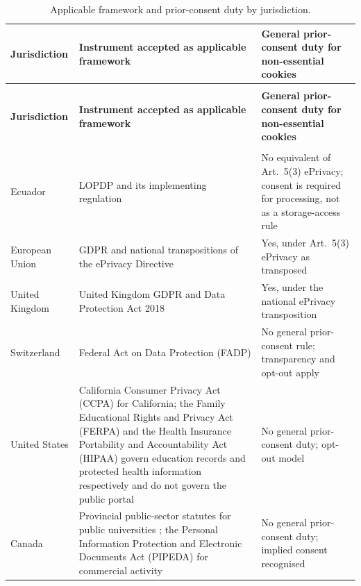 \documentclass[pdflatex,sn-basic,Numbered,iicol]{sn-jnl}
\theoremstyle{thmstyleone}
\theoremstyle{thmstyletwo}
\theoremstyle{thmstylethree}
\begin{document}
\begin{appendices}
\footnotesize
\begin{longtable}{@{}>{\RaggedRight}p{2.4cm}>{\RaggedRight}p{5.5cm}>{\RaggedRight\arraybackslash}p{4.1cm}@{}}
	\caption{Applicable framework and prior-consent duty by jurisdiction.}\label{tab:mapeo}\\
	\toprule
	\textbf{Jurisdiction} & \textbf{Instrument accepted as applicable framework} & \textbf{General prior-consent duty for non-essential cookies} \\
	\midrule
	\endfirsthead
	\multicolumn{3}{c}{\textit{(Table~\ref{tab:mapeo}, continued)}}\\
	\toprule
	\textbf{Jurisdiction} & \textbf{Instrument accepted as applicable framework} & \textbf{General prior-consent duty for non-essential cookies} \\
	\midrule
	\endhead
	\midrule
	\multicolumn{3}{r}{\textit{Continued on next page}}\\
	\endfoot
	\bottomrule
	\endlastfoot
	Ecuador & LOPDP and its implementing regulation \citep{lopdp2021,reglamentolopdp2023} & No equivalent of Art.\ 5(3) ePrivacy; consent is required for processing, not as a storage-access rule \\
	\addlinespace
	European Union & GDPR \citep{gdpr2016} and national transpositions of the ePrivacy Directive \citep{eprivacy2002} & Yes, under Art.\ 5(3) ePrivacy as transposed \citep{edpb2024eprivacy} \\
	\addlinespace
	United Kingdom & United Kingdom GDPR and Data Protection Act 2018 \citep{ukdpa2018} & Yes, under the national ePrivacy transposition \\
	\addlinespace
	Switzerland & Federal Act on Data Protection (FADP) \citep{fadp_ch} & No general prior-consent rule; transparency and opt-out apply \\
	\addlinespace
	United States & California Consumer Privacy Act (CCPA) \citep{ccpa2018} for California; the Family Educational Rights and Privacy Act (FERPA) \citep{ferpa1974} and the Health Insurance Portability and Accountability Act (HIPAA) \citep{hipaa1996} govern education records and protected health information respectively and do not govern the public portal & No general prior-consent duty; opt-out model \\
	\addlinespace
	Canada & Provincial public-sector statutes for public universities \citep{fippa_on,fippa_bc,quebec_privacy}; the Personal Information Protection and Electronic Documents Act (PIPEDA) \citep{pipeda2000} for commercial activity & No general prior-consent duty; implied consent recognised \\

\end{longtable}
\end{appendices}
\end{document}
